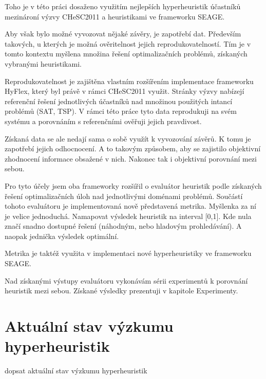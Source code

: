 
Toho je v této práci dosaženo využitím nejlepších hyperheuristik účastníků mezinároní výzvy CHeSC2011 a heuristikami ve frameworku SEAGE.


Aby však bylo možné vyvozovat nějaké závěry, je zapotřebí dat. Především takových, u kterých je možná ověritelnost jejich reprodukovatelností. Tím je v tomto kontextu myšlena množina řešení optimalizačních problémů, získaných vybranými heuristikami.

Reprodukovatelnost je zajištěna vlastním rozšířením implementace frameworku HyFlex, který byl právě v rámci CHeSC2011 využit. Stránky výzvy nabízejí referenční řešení jednotlivých účastníků nad množinou použitých intancí problémů (SAT, TSP). V rámci této práce tyto data reprodukuji na svém systému a porovnáním s referenčními ověřuji jejich pravdivost. 

Získaná data se ale nedají sama o sobě využít k vyvozování závěrů. K tomu je zapotřebí jejich odhocnocení. A to takovým způsobem, aby se zajistilo objektivní zhodnocení informace obsažené v nich. Nakonec tak i objektivní porovnání mezi sebou.

Pro tyto účely jsem oba frameworky rozšířil o evaluátor heuristik podle získaných řešení optimalizačních úloh nad jednotlivými doménami problémů. Součástí tohoto evaluátoru je implementovaná nově představená metrika. Myšlenka za ní je velice jednoduchá. Namapovat výsledek heuristik  na interval [0,1]. Kde nula značí snadno dostupné řešení (náhodným, nebo hladovým prohledávání). A naopak jednička výsledek optimální.

Metrika je taktéž využita v implementaci nové hyperheuristiky ve frameworku SEAGE.

Nad získanými výstupy evaluátoru vykonávám sérii experimentů k porovnání heuristik mezi sebou. Získané výsledky prezentuji v kapitole Experimenty.

\section{Aktuální stav výzkumu hyperheuristik}

dopsat aktuální stav výzkumu hyperheuristik
\cite{DRAKE2020405}
